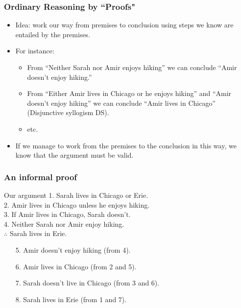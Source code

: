 \begin{frame}
  \frametitle{Ordinary Reasoning by ``Proofs"}

  \begin{itemize}[<+->]
    \item Idea: work our way from premises to conclusion using steps
    we know are entailed by the premises.
    \item For instance:
      \begin{itemize}[<+->]
        \item From ``Neither Sarah nor Amir enjoys hiking'' we can
        conclude ``Amir doesn't enjoy hiking.''
        \item From ``Either Amir lives in Chicago or he enjoys hiking''
        and ``Amir doesn't enjoy hiking'' we can conclude ``Amir
        lives in Chicago'' (Disjunctive syllogism DS).
        \item etc.
      \end{itemize}
    \item If we manage to work from the premises to the conclusion in
    this way, we know that the argument must be valid.
  \end{itemize}

\end{frame}

\begin{frame}
  \frametitle{An informal proof}

  \begin{block}{Our argument}
  1. Sarah lives in Chicago or Erie.\\
  2. Amir lives in Chicago unless he enjoys hiking.\\
  3. If Amir lives in Chicago, Sarah doesn't.\\
  4. Neither Sarah nor Amir enjoy hiking.\\
  $\therefore$ Sarah lives in Erie.
  \end{block}

  \begin{enumerate}[<+->]
    \item[5.] Amir doesn't enjoy hiking (from 4).
    \item[6.] Amir lives in Chicago (from 2 and 5).
    \item[7.] Sarah doesn't live in Chicago (from 3 and 6).
    \item[8.] Sarah lives in Erie (from 1 and 7).
  \end{enumerate}

\end{frame}

